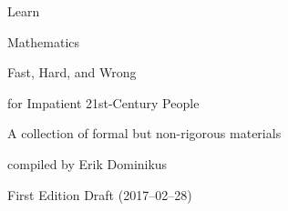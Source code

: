 \begin{titlingpage}
{
\selectfont
\setlength\parindent{0em}
\setlength\parskip{0em}
{\fontsize{63pt}{72pt}\selectfont Learn\par Mathematics\par}\vspace{2em}
{\fontsize{36pt}{36pt}\selectfont Fast, Hard, and Wrong\par}\vspace{2em}
{\fontsize{24pt}{24pt}\selectfont for Impatient 21st-Century People\par}
\vfill
{\fontsize{17pt}{24pt}\selectfont A collection of formal but non-rigorous materials\par compiled by Erik Dominikus\par\vspace{2em}}
{\fontsize{17pt}{17pt}\selectfont First Edition Draft (2017--02--28)\par}
}
\end{titlingpage}
\restoregeometry

